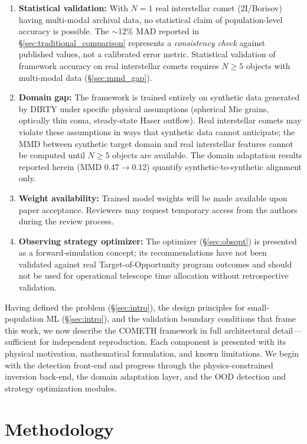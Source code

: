 \documentclass[usenatbib]{mnras}
\begin{document}
\begin{enumerate}
    \item \textbf{Statistical validation:} With $N=1$ real interstellar comet (2I/Borisov) having multi-modal archival data, no statistical claim of population-level accuracy is possible. The $\sim$12\% MAD reported in \S\ref{sec:traditional_comparison} represents a \textit{consistency check} against published values, not a calibrated error metric. Statistical validation of framework accuracy on real interstellar comets requires $N \geq 5$ objects with multi-modal data (\S\ref{sec:mmd_gap}).
    \item \textbf{Domain gap:} The framework is trained entirely on synthetic data generated by DIRTY under specific physical assumptions (spherical Mie grains, optically thin coma, steady-state Haser outflow). Real interstellar comets may violate these assumptions in ways that synthetic data cannot anticipate; the MMD between synthetic target domain and real interstellar features cannot be computed until $N \geq 5$ objects are available. The domain adaptation results reported herein (MMD 0.47$\to$0.12) quantify synthetic-to-synthetic alignment only.
    \item \textbf{Weight availability:} Trained model weights will be made available upon paper acceptance. Reviewers may request temporary access from the authors during the review process.
    \item \textbf{Observing strategy optimizer:} The optimizer (\S\ref{sec:obsopt}) is presented as a forward-simulation concept; its recommendations have not been validated against real Target-of-Opportunity program outcomes and should not be used for operational telescope time allocation without retrospective validation.
\end{enumerate}

Having defined the problem (\S\ref{sec:intro}), the design principles for small-population ML (\S\ref{sec:intro}), and the validation boundary conditions that frame this work, we now describe the COMETH framework in full architectural detail---sufficient for independent reproduction. Each component is presented with its physical motivation, mathematical formulation, and known limitations. We begin with the detection front-end and progress through the physics-constrained inversion back-end, the domain adaptation layer, and the OOD detection and strategy optimization modules.

\section{Methodology}\label{sec:methods}
\end{document}
